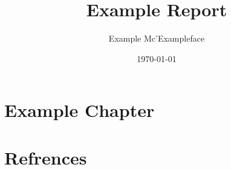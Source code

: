 \documentclass{report}
\begin{document}
\title{Example Report}
\author{Example Mc'Exampleface}
\date{\today}

\maketitle{}

\tableofcontents{}

\chapter{Example Chapter}


\chapter{Refrences}
 {
  \renewcommand{\chapter}[2]{}
  
 }
\end{document}
